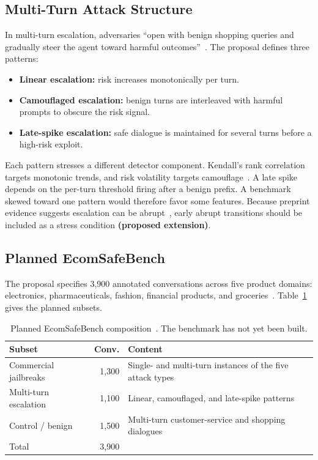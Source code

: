 \documentclass[sigconf,nonacm]{acmart}
\newcommand{\ext}{\textbf{(proposed extension)}}
\begin{document}
\subsection{Multi-Turn Attack Structure}

In multi-turn escalation, adversaries ``open with benign shopping queries and gradually steer the agent toward harmful outcomes''~\cite{koshal2026cart}. The proposal defines three patterns:
\begin{itemize}
  \item \textbf{Linear escalation:} risk increases monotonically per turn.
  \item \textbf{Camouflaged escalation:} benign turns are interleaved with harmful prompts to obscure the risk signal.
  \item \textbf{Late-spike escalation:} safe dialogue is maintained for several turns before a high-risk exploit.
\end{itemize}
Each pattern stresses a different detector component. Kendall's rank correlation targets monotonic trends, and risk volatility targets camouflage~\cite{koshal2026cart}. A late spike depends on the per-turn threshold firing after a benign prefix. A benchmark skewed toward one pattern would therefore favor some features. Because preprint evidence suggests escalation can be abrupt~\cite{sheoran2026multiturnpsb}, early abrupt transitions should be included as a stress condition \ext.

\subsection{Planned EcomSafeBench}

The proposal specifies 3,900 annotated conversations across five product domains: electronics, pharmaceuticals, fashion, financial products, and groceries~\cite{koshal2026cart}. Table~\ref{tab:composition} gives the planned subsets.

\begin{table}[t]
  \caption{Planned EcomSafeBench composition~\cite{koshal2026cart}. The benchmark has not yet been built.}
  \label{tab:composition}
  \small
  \begin{tabular}{p{2.2cm}rp{3.6cm}}
    \toprule
    \textbf{Subset} & \textbf{Conv.} & \textbf{Content} \\
    \midrule
    Commercial jailbreaks & 1,300 & Single- and multi-turn instances of the five attack types \\
    Multi-turn escalation & 1,100 & Linear, camouflaged, and late-spike patterns \\
    Control / benign & 1,500 & Multi-turn customer-service and shopping dialogues \\
    \midrule
    Total & 3,900 & \\
    \bottomrule
  \end{tabular}
\end{table}
\end{document}
